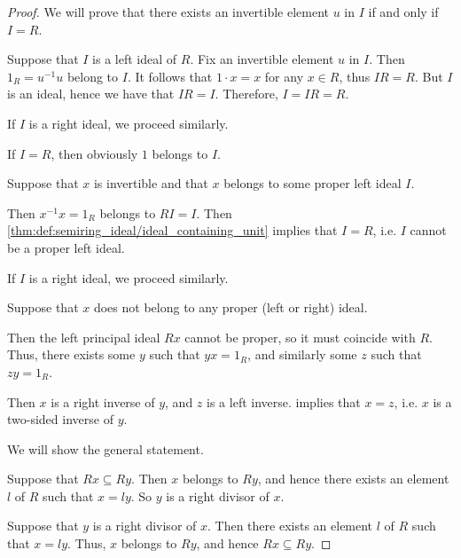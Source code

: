 \begin{proof}
   We will prove that there exists an invertible element \( u \) in \( I \) if and only if \( I = R \).

  \SufficiencySubProof* Suppose that \( I \) is a left ideal of \( R \). Fix an invertible element \( u \) in \( I \). Then \( 1_R = u^{-1} u \) belong to \( I \). It follows that \( 1 \cdot x = x \) for any \( x \in R \), thus \( IR = R \). But \( I \) is an ideal, hence we have that \( IR = I \). Therefore, \( I = IR = R \).

  If \( I \) is a right ideal, we proceed similarly.

  \NecessitySubProof* If \( I = R \), then obviously \( 1 \) belongs to \( I \).


  \SufficiencySubProof* Suppose that \( x \) is invertible and that \( x \) belongs to some proper left ideal \( I \).

  Then \( x^{-1} x = 1_R \) belongs to \( RI = I \). Then \cref{thm:def:semiring_ideal/ideal_containing_unit} implies that \( I = R \), i.e. \( I \) cannot be a proper left ideal.

  If \( I \) is a right ideal, we proceed similarly.

  \NecessitySubProof* Suppose that \( x \) does not belong to any proper (left or right) ideal.

  Then the left principal ideal \( Rx \) cannot be proper, so it must coincide with \( R \). Thus, there exists some \( y \) such that \( yx = 1_R \), and similarly some \( z \) such that \( zy = 1_R \).

  Then \( x \) is a right inverse of \( y \), and \( z \) is a left inverse.  implies that \( x = z \), i.e. \( x \) is a two-sided inverse of \( y \).

   We will show the general statement.

  \SufficiencySubProof* Suppose that \( Rx \subseteq Ry \). Then \( x \) belongs to \( Ry \), and hence there exists an element \( l \) of \( R \) such that \( x = ly \). So \( y \) is a right divisor of \( x \).

  \NecessitySubProof* Suppose that \( y \) is a right divisor of \( x \). Then there exists an element \( l \) of \( R \) such that \( x = ly \). Thus, \( x \) belongs to \( Ry \), and hence \( Rx \subseteq Ry \).


\end{proof}
